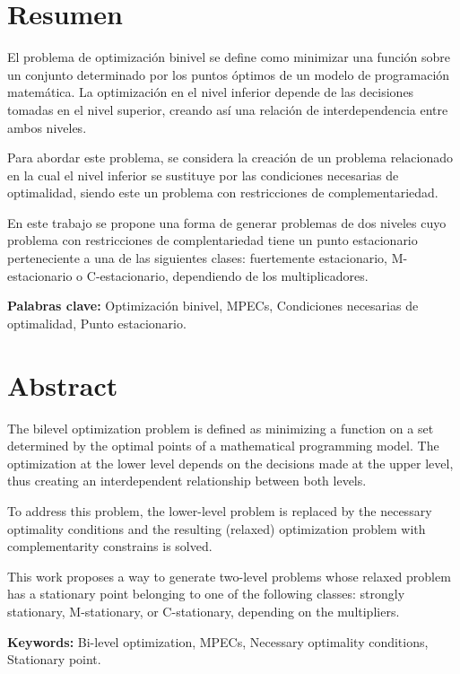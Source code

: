 \chapter*{Resumen}

El problema de optimización binivel se define como minimizar una función sobre un conjunto determinado por los puntos óptimos de un modelo de programación matemática. La optimización en el nivel inferior depende de las decisiones tomadas en el nivel superior, creando así una relación de interdependencia entre ambos niveles.

Para abordar este problema, se considera la creación de un problema relacionado en la cual el nivel inferior se sustituye por las condiciones necesarias de optimalidad, siendo este un problema con restricciones de complementariedad.

En este trabajo se propone una forma de generar problemas de dos niveles cuyo problema con restricciones de complentariedad tiene un punto estacionario perteneciente a una de las siguientes 
clases: fuertemente estacionario, M-estacionario o C-estacionario, dependiendo de los multiplicadores.


\textbf{Palabras clave:} Optimización binivel, MPECs, Condiciones necesarias de optimalidad, Punto estacionario.

\chapter*{Abstract}
The bilevel optimization problem is defined as minimizing a function on a set determined by the optimal points of a mathematical programming model. The optimization at the lower level depends on the decisions made at the upper level, thus creating an interdependent relationship between both levels.

To address this problem, the lower-level problem is replaced by the necessary optimality conditions and the resulting (relaxed) optimization problem with complementarity constrains is solved.

This work proposes a way to generate two-level problems whose relaxed problem has a stationary point belonging to one of the following classes: strongly stationary, M-stationary, or C-stationary, depending on the multipliers.

\textbf{Keywords:} Bi-level optimization, MPECs, Necessary optimality conditions, Stationary point.
